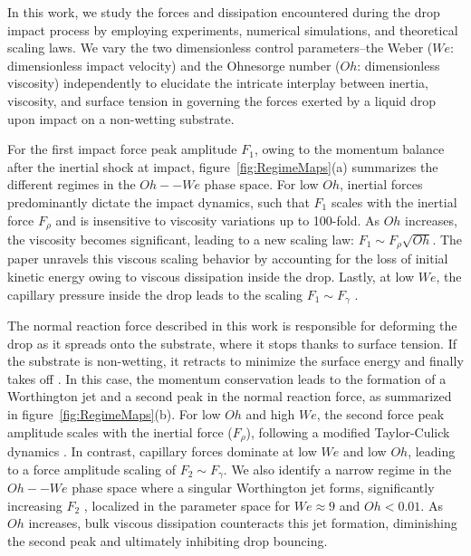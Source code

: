 \documentclass{jfm}
\begin{document}
In this work, we study the forces and dissipation encountered during the drop impact process by employing experiments, numerical simulations, and theoretical scaling laws. We vary the two dimensionless control parameters--the Weber ($We$: dimensionless impact velocity) and the Ohnesorge number ($Oh$: dimensionless viscosity) independently to elucidate the intricate interplay between inertia, viscosity, and surface tension in governing the forces exerted by a liquid drop upon impact on a non-wetting substrate.

For the first impact force peak amplitude $F_1$, owing to the momentum balance after the inertial shock at impact, figure~\ref{fig:RegimeMaps}(a) summarizes the different regimes in the $Oh--We$ phase space. For low $Oh$, inertial forces predominantly dictate the impact dynamics, such that $F_1$ scales with the inertial force $F_\rho$ \citep{Philippi2016, Gordillo2018, Mitchell2019, cheng2021drop, zhang2022impact} and is insensitive to viscosity variations up to 100-fold. As $Oh$ increases, the viscosity becomes significant, leading to a new scaling law: $F_1 \sim F_\rho\sqrt{Oh}$. The paper unravels this viscous scaling behavior by accounting for the loss of initial kinetic energy owing to viscous dissipation inside the drop. Lastly, at low $We$, the capillary pressure inside the drop leads to the scaling $F_1 \sim F_\gamma$ \citep{molavcek2012quasi, chevy2012liquid}. 

The normal reaction force described in this work is responsible for deforming the drop as it spreads onto the substrate, where it stops thanks to surface tension. If the substrate is non-wetting, it retracts to minimize the surface energy and finally takes off \citep{Richard2000}. In this case, the momentum conservation leads to the formation of a Worthington jet and a second peak in the normal reaction force, as summarized in figure~\ref{fig:RegimeMaps}(b). For low $Oh$ and high $We$, the second force peak amplitude scales with the inertial force ($F_\rho$), following a modified Taylor-Culick dynamics \citep{Eggers2010}. In contrast, capillary forces dominate at low $We$ and low $Oh$, leading to a force amplitude scaling of $F_2 \sim F_\gamma$. We also identify a narrow regime in the $Oh--We$ phase space where a singular Worthington jet forms, significantly increasing $F_2$ \citep{Bartolo2006Singular, zhang2022impact}, localized in the parameter space for $We \approx 9$ and $Oh < 0.01$. As $Oh$ increases, bulk viscous dissipation counteracts this jet formation, diminishing the second peak and ultimately inhibiting drop bouncing. 
\end{document}
